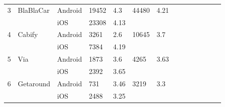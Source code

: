 \documentclass[12pt]{article}
\begin{document}
\begin{table}[!h]
\begin{tabular}{p{0.5cm}lp{1.5cm}lp{2cm}lp{2cm}lp{2cm}lp{2cm}lp{2cm}l}
3           & BlaBlaCar         & Android     & 19452                                                                    & 4.3                                                                        & 44480                                                                             & 4.21                               \\
           &                   & iOS         & 23308                                                                    & 4.13                                                                       &                                                                                   &                                    \\
4           & Cabify            & Android     & 3261                                                                     & 2.6                                                                        & 10645                                                                             & 3.7                                \\
           &                   & iOS         & 7384                                                                     & 4.19                                                                       &                                                                                   &                                    \\
5           & Via               & Android     & 1873                                                                     & 3.6                                                                        & 4265                                                                              & 3.63                               \\
          &                   & iOS         & 2392                                                                     & 3.65                                                                       &                                                                                   &                                    \\
6           & Getaround         & Android     & 731                                                                      & 3.46                                                                       & 3219                                                                              & 3.3                                \\
            &                   & iOS         & 2488                                                                     & 3.25                                                                       &                                                                                   &                                    \\

\end{tabular}
\end{table}
\end{document}
